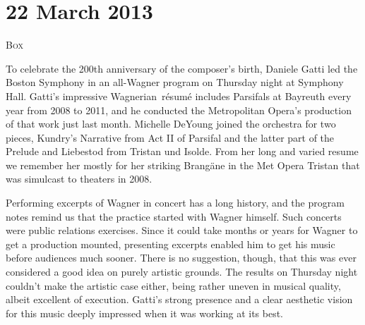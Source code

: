 \chapter{22 March 2013}

\textsc{Box}

To celebrate the 200th anniversary of the composer’s birth, Daniele Gatti led the Boston Symphony in an all-Wagner program on Thursday night at Symphony Hall. Gatti's impressive Wagnerian résumé includes Parsifals at Bayreuth every year from 2008 to 2011, and he conducted the Metropolitan Opera’s production of that work just last month. Michelle DeYoung joined the orchestra for two pieces, Kundry’s Narrative from Act II of Parsifal and the latter part of the Prelude and Liebestod from Tristan und Isolde. From her long and varied resume we remember her mostly for her striking Brangäne in the Met Opera Tristan that was simulcast to theaters in 2008.

Performing excerpts of Wagner in concert has a long history, and the program notes remind us that the practice started with Wagner himself. Such concerts were public relations exercises. Since it could take months or years for Wagner to get a production mounted, presenting excerpts enabled him to get his music before audiences much sooner. There is no suggestion, though, that this was ever considered a good idea on purely artistic grounds. The results on Thursday night couldn’t make the artistic case either, being rather uneven in musical quality, albeit excellent of execution. Gatti’s strong presence and a clear aesthetic vision for this music deeply impressed when it was working at its best.

